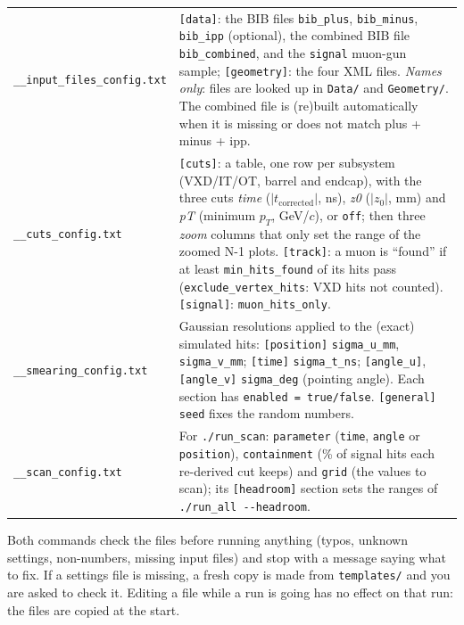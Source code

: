 \documentclass[11pt,letterpaper]{article}
\newcommand{\code}[1]{\texttt{#1}}
\newcommand{\pT}{\ensuremath{p_T}}
\newcommand{\cuts}{\code{\_\_cuts\_config.txt}}
\newcommand{\smear}{\code{\_\_smearing\_config.txt}}
\newcommand{\inputs}{\code{\_\_input\_files\_config.txt}}
\newcommand{\scan}{\code{\_\_scan\_config.txt}}
\begin{document}
\begin{tabularx}{\linewidth}{@{}l >{\raggedright\arraybackslash}X@{}}
\toprule
\inputs & \code{[data]}: the BIB files \code{bib\_plus}, \code{bib\_minus},
  \code{bib\_ipp} (optional), the combined BIB file \code{bib\_combined},
  and the \code{signal} muon-gun sample; \code{[geometry]}: the four XML
  files. \emph{Names only}: files are looked up in \code{Data/} and
  \code{Geometry/}. The combined file is (re)built automatically when it
  is missing or does not match plus + minus + ipp.\\[3pt]
\cuts & \code{[cuts]}: a table, one row per subsystem (VXD/IT/OT, barrel
  and endcap), with the three cuts \emph{time} ($|t_\mathrm{corrected}|$, ns),
  \emph{z0} ($|z_0|$, mm) and \emph{pT} (minimum \pT, GeV/$c$), or \code{off};
  then three \emph{zoom} columns that only set the range of the zoomed N-1
  plots. \code{[track]}: a muon is ``found'' if at least
  \code{min\_hits\_found} of its hits pass (\code{exclude\_vertex\_hits}:
  VXD hits not counted). \code{[signal]}: \code{muon\_hits\_only}.\\[3pt]
\smear & Gaussian resolutions applied to the (exact) simulated hits:
  \code{[position]} \code{sigma\_u\_mm}, \code{sigma\_v\_mm};
  \code{[time]} \code{sigma\_t\_ns}; \code{[angle\_u]}, \code{[angle\_v]}
  \code{sigma\_deg} (pointing angle). Each section has
  \code{enabled = true/false}. \code{[general] seed} fixes the random numbers.\\[3pt]
\scan & For \code{./run\_scan}: \code{parameter} (\code{time},
  \code{angle} or \code{position}), \code{containment} (\% of signal hits
  each re-derived cut keeps) and \code{grid} (the values to scan); its
  \code{[headroom]} section sets the ranges of \code{./run\_all -{}-headroom}.\\
\bottomrule
\end{tabularx}

Both commands check the files before running anything (typos, unknown
settings, non-numbers, missing input files) and stop with a message saying
what to fix. If a settings file is missing, a fresh copy is made from
\code{templates/} and you are asked to check it. Editing a file while a run
is going has no effect on that run: the files are copied at the start.

\end{document}
